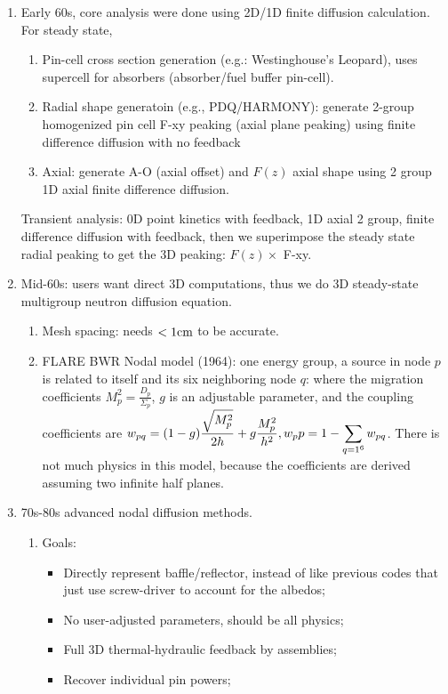 \documentclass{school-22.211-notes}
\begin{document}
\clearpage
{}
\begin{enumerate}
\item Early 60s, core analysis were done using 2D/1D finite diffusion calculation. For steady state,
  \begin{enumerate}
  \item Pin-cell cross section generation (e.g.: Westinghouse's Leopard), uses supercell for absorbers (absorber/fuel buffer pin-cell). 
  \item Radial shape generatoin (e.g., PDQ/HARMONY): generate 2-group homogenized pin cell F-xy peaking (axial plane peaking) using finite difference diffusion with no feedback 
  \item Axial: generate A-O (axial offset) and $F(z)$ axial shape using 2 group 1D axial finite difference diffusion. 
  \end{enumerate}
  Transient analysis: 0D point kinetics with feedback, 1D axial 2 group, finite difference diffusion with feedback, then we superimpose the steady state radial peaking to get the 3D peaking: $F(z) \times$ F-xy. 

\item Mid-60s: users want direct 3D computations, thus we do 3D steady-state multigroup neutron diffusion equation. 
  \begin{enumerate}
  \item Mesh spacing: needs $< 1\mathrm{cm}$ to be accurate. 
  \item FLARE BWR Nodal model (1964): one energy group, a source in node $p$ is related to itself and its six neighboring node $q$: 
    where the migration coefficients $M_p^2 = \frac{D_p}{\Sigma_p}$, $g$ is an adjustable parameter, and the coupling coefficients are $\displaystyle w_{pq} = (1-g) \frac{\sqrt{M_p^2}}{2h} + g \frac{M_p^2}{h^2}, w_pp = 1 - \displaystyle\sum_{q=1^6} w_{pq}$. 
    There is not much physics in this model, because the coefficients are derived assuming two infinite half planes. 
  \end{enumerate}

  \item 70s-80s advanced nodal diffusion methods. 
    \begin{enumerate}
    \item Goals: 
      \begin{itemize}
      \item Directly represent baffle/reflector, instead of like previous codes that just use screw-driver to account for the albedos; 
      \item No user-adjusted parameters, should be all physics; 
      \item Full 3D thermal-hydraulic feedback by assemblies;
      \item Recover individual pin powers; 
      \end{itemize}


\end{enumerate}
\end{enumerate}
\end{document}
